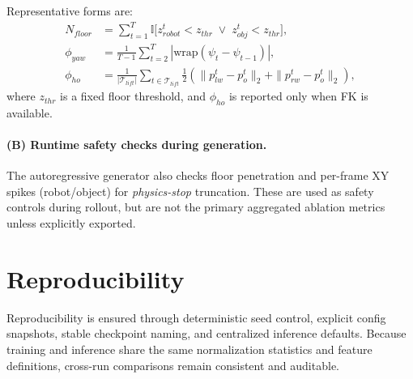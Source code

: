 Representative forms are:
\begin{align}
N_{floor} &= \sum_{t=1}^{T} \mathbb{I}\big[z_{robot}^t < z_{thr} \;\lor\; z_{obj}^t < z_{thr}\big], \\
\phi_{yaw} &= \frac{1}{T-1}\sum_{t=2}^{T} \left|\mathrm{wrap}(\psi_t-\psi_{t-1})\right|, \\
\phi_{ho} &= \frac{1}{|\mathcal{T}_{lift}|}\sum_{t\in\mathcal{T}_{lift}} \tfrac{1}{2}\left(\|p_{lw}^t-p_o^t\|_2 + \|p_{rw}^t-p_o^t\|_2\right),
\end{align}
where $z_{thr}$ is a fixed floor threshold, and $\phi_{ho}$ is reported only when FK is available.

\paragraph{(B) Runtime safety checks during generation.}
The autoregressive generator also checks floor penetration and per-frame XY spikes (robot/object) for \emph{physics-stop} truncation. These are used as safety controls during rollout, but are not the primary aggregated ablation metrics unless explicitly exported.

\section{Reproducibility}

Reproducibility is ensured through deterministic seed control, explicit config snapshots, stable checkpoint naming, and centralized inference defaults. Because training and inference share the same normalization statistics and feature definitions, cross-run comparisons remain consistent and auditable.
